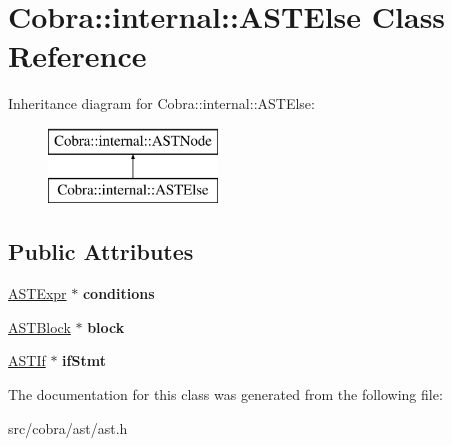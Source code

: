 \hypertarget{class_cobra_1_1internal_1_1_a_s_t_else}{\section{Cobra\+:\+:internal\+:\+:A\+S\+T\+Else Class Reference}
\label{class_cobra_1_1internal_1_1_a_s_t_else}
}
Inheritance diagram for Cobra\+:\+:internal\+:\+:A\+S\+T\+Else\+:\begin{figure}[H]
\begin{center}
\leavevmode
\includegraphics[height=2.000000cm]{class_cobra_1_1internal_1_1_a_s_t_else}
\end{center}
\end{figure}
\subsection*{Public Attributes}
\begin{DoxyCompactItemize}
\item 
\hypertarget{class_cobra_1_1internal_1_1_a_s_t_else_a6dbc7cd7172739f57de42510cfc261ca}{\hyperlink{class_cobra_1_1internal_1_1_a_s_t_expr}{A\+S\+T\+Expr} $\ast$ {\bfseries conditions}}\label{class_cobra_1_1internal_1_1_a_s_t_else_a6dbc7cd7172739f57de42510cfc261ca}

\item 
\hypertarget{class_cobra_1_1internal_1_1_a_s_t_else_a7353693c92ca38e5bef78ee483db681a}{\hyperlink{class_cobra_1_1internal_1_1_a_s_t_block}{A\+S\+T\+Block} $\ast$ {\bfseries block}}\label{class_cobra_1_1internal_1_1_a_s_t_else_a7353693c92ca38e5bef78ee483db681a}

\item 
\hypertarget{class_cobra_1_1internal_1_1_a_s_t_else_a61d07a78a5462b42d89428825cd7f168}{\hyperlink{class_cobra_1_1internal_1_1_a_s_t_if}{A\+S\+T\+If} $\ast$ {\bfseries if\+Stmt}}\label{class_cobra_1_1internal_1_1_a_s_t_else_a61d07a78a5462b42d89428825cd7f168}

\end{DoxyCompactItemize}


The documentation for this class was generated from the following file\+:\begin{DoxyCompactItemize}
\item 
src/cobra/ast/ast.\+h\end{DoxyCompactItemize}

